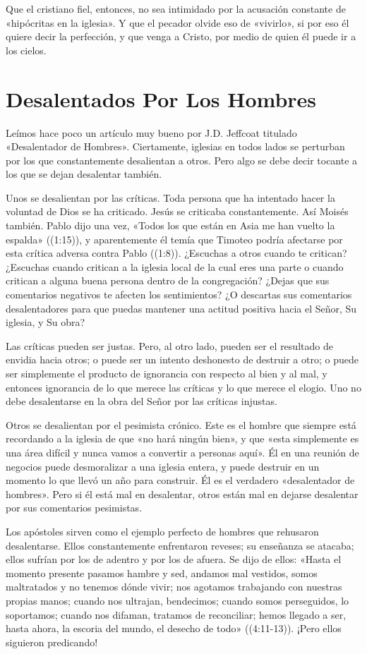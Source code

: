 \documentclass[12pt, twoside, openright]{book}
\begin{document}
Que el cristiano fiel, entonces, no sea intimidado por la acusación constante de «hipócritas en la iglesia». Y que el pecador olvide eso de «vivirlo», si por eso él quiere decir la perfección, y que venga a Cristo, por medio de quien él puede ir a los cielos.

\section{Desalentados Por Los Hombres}
Leímos hace poco un artículo muy bueno por J.D. Jeffcoat titulado «Desalentador de Hombres». Ciertamente, iglesias en todos lados se perturban por los que constantemente desalientan a otros. Pero algo se debe decir tocante a los que se dejan desalentar también. 

Unos se desalientan por las críticas. Toda persona que ha intentado hacer la voluntad de Dios se ha criticado. Jesús se criticaba constantemente. Así Moisés también. Pablo dijo una vez, «Todos los que están en Asia me han vuelto la espalda» ((1:15)), y aparentemente él temía que Timoteo podría afectarse por esta crítica adversa contra Pablo ((1:8)). ¿Escuchas a otros cuando te critican? ¿Escuchas cuando critican a la iglesia local de la cual eres una parte o cuando critican a alguna buena persona dentro de la congregación? ¿Dejas que sus comentarios negativos te afecten los sentimientos? ¿O descartas sus comentarios desalentadores para que puedas mantener una actitud positiva hacia el Señor, Su iglesia, y Su obra?

Las críticas pueden ser justas. Pero, al otro lado, pueden ser el resultado de envidia hacia otros; o puede ser un intento deshonesto de destruir a otro; o puede ser simplemente el producto de ignorancia con respecto al bien y al mal, y entonces ignorancia de lo que merece las críticas y lo que merece el elogio. Uno no debe desalentarse en la obra del Señor por las críticas injustas.

Otros se desalientan por el pesimista crónico. Este es el hombre que siempre está recordando a la iglesia de que «no hará ningún bien», y que «esta simplemente es una área difícil y nunca vamos a convertir a personas aquí». Él en una reunión de negocios puede desmoralizar a una iglesia entera, y puede destruir en un momento lo que llevó un año para construir. Él es el verdadero «desalentador de hombres». Pero si él está mal en desalentar, otros están mal en dejarse desalentar por sus comentarios pesimistas. 

Los apóstoles sirven como el ejemplo perfecto de hombres que rehusaron desalentarse. Ellos constantemente enfrentaron reveses; su enseñanza se atacaba; ellos sufrían por los de adentro y por los de afuera. Se dijo de ellos: «Hasta el momento presente pasamos hambre y sed, andamos mal vestidos, somos maltratados y no tenemos dónde vivir; nos agotamos trabajando con nuestras propias manos; cuando nos ultrajan, bendecimos; cuando somos perseguidos, lo soportamos; cuando nos difaman, tratamos de reconciliar; hemos llegado a ser, hasta ahora, la escoria del mundo, el desecho de todo» ((4:11-13)). ¡Pero ellos siguieron predicando! 
\end{document}
